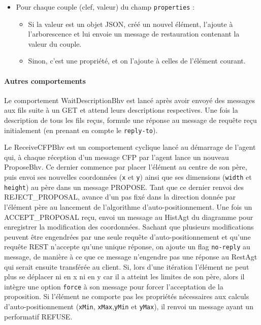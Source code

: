 \begin{itemize}
	\begin{itemize}
		\item Pour chaque couple (clef, valeur) du champ \lstinline$properties$ :
		\begin{itemize}
			\item Si la valeur est un objet JSON, créé un nouvel élément, l'ajoute à l'arborescence et lui envoie un message de restauration contenant la valeur du couple.
			\item Sinon, c'est une propriété, et on l'ajoute à celles de l'élément courant.
		\end{itemize}
	\end{itemize}
\end{itemize}

\paragraph{Autres comportements}
Le comportement WaitDescriptionBhv est lancé après avoir envoyé des messages aux fils suite à un GET et attend leurs descriptions respectives.
Une fois la description de tous les fils reçus, formule une réponse au message de requête reçu initialement (en prenant en compte le \lstinline$reply-to$).

Le ReceiveCFPBhv est un comportement cyclique lancé au démarrage de l'agent qui, à chaque réception d'un message CFP par l'agent lance un nouveau ProposeBhv.
Ce dernier commence par placer l'élément au centre de son père, puis envoi ses nouvelles coordonnées (\lstinline$x$ et \lstinline$y$) ainsi que ses dimensions (\lstinline$width$ et \lstinline$height$) au père dans un message PROPOSE.
Tant que ce dernier renvoi des REJECT\_PROPOSAL, avance d'un pas fixé dans la direction donnée par l'élément père au lancement de l'algorithme d'auto-positionnement.
Une fois un ACCEPT\_PROPOSAL reçu, envoi un message au HistAgt du diagramme pour enregistrer la modification des coordonnées.
Sachant que plusieurs modifications peuvent être engendrées par une seule requête d'auto-positionnement et qu'une requête REST n'accepte qu'une unique réponse, on ajoute un flag \lstinline$no-reply$ au message, de manière à ce que ce message n'engendre pas une réponse au RestAgt qui serait ensuite transférée au client.
Si, lors d'une itération l'élément ne peut plus se déplacer ni en x ni en y car il a atteint les limites de son père, alors il intègre une option \lstinline$force$ à son message pour forcer l'acceptation de la proposition.
Si l'élément ne comporte pas les propriétés nécessaires aux calculs d'auto-positionnement (\lstinline$xMin$, \lstinline$xMax$,\lstinline$yMin$ et \lstinline$yMax$), il renvoi un message ayant un performatif REFUSE.


